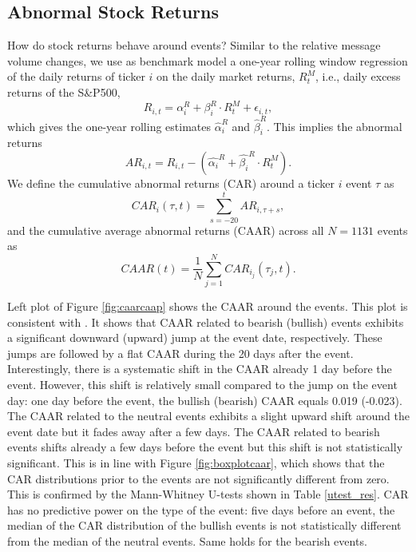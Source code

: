 \subsection{Abnormal Stock Returns}
How do stock returns behave around events? Similar to the relative message volume changes, we use as benchmark model a one-year rolling window regression of the daily returns of ticker $i$ on the daily market returns, $R^M_{t}$, i.e., daily excess returns of the S\&P500,
\begin{equation}
    R_{i,t}= \alpha_i^R  + \beta_i^R \cdot R_t^M  + \epsilon_{i,t},
\end{equation}
which gives the one-year rolling estimates $\hat{\alpha}_i^R$ and $\hat{\beta}_i^R$. This implies the abnormal returns 
\begin{equation}
    AR_{i,t} = R_{i,t} - \left(\hat{\alpha_i}^R + \hat{\beta_i}^R \cdot R_t^M\right).
\end{equation}
We define the cumulative abnormal returns (CAR) around a ticker $i$ event $\tau$ as 
\begin{equation}
    CAR_i(\tau,t) = \sum_{s=- 20}^{t} AR_{i,\tau + s},
\end{equation}
and the cumulative average abnormal returns (CAAR) across all $N=1131$ events as 
\begin{equation}
         CAAR(t) = \dfrac{1}{N} \sum_{j=1}^N CAR_{i_j}(\tau_j,t).
\end{equation}
 
Left plot of Figure \ref{fig:caarcaap} shows the CAAR around the events. This plot is consistent with \citet{mackinlay1997event}. It shows that CAAR related to bearish (bullish) events exhibits a significant downward (upward) jump at the event date, respectively. These jumps are followed by a flat CAAR during the 20 days after the event. Interestingly, there is a systematic shift in the CAAR already 1 day before the event. However, this shift is relatively small compared to the jump on the event day: one day before the event, the bullish (bearish) CAAR equals 0.019 (-0.023). The CAAR related to the neutral events exhibits a slight upward shift around the event date but it fades away after a few days. The CAAR related to bearish events shifts already a few days before the event but this shift is not statistically significant. This is in line with Figure \ref{fig:boxplotcaar}, which shows that the CAR distributions prior to the events are not significantly different from zero. This is confirmed by the Mann-Whitney U-tests shown in Table \ref{utest_res}. CAR has no predictive power on the type of the event: five days before an event, the median of the CAR distribution of the bullish events is not statistically different from the median of the neutral events. Same holds for the bearish events.


